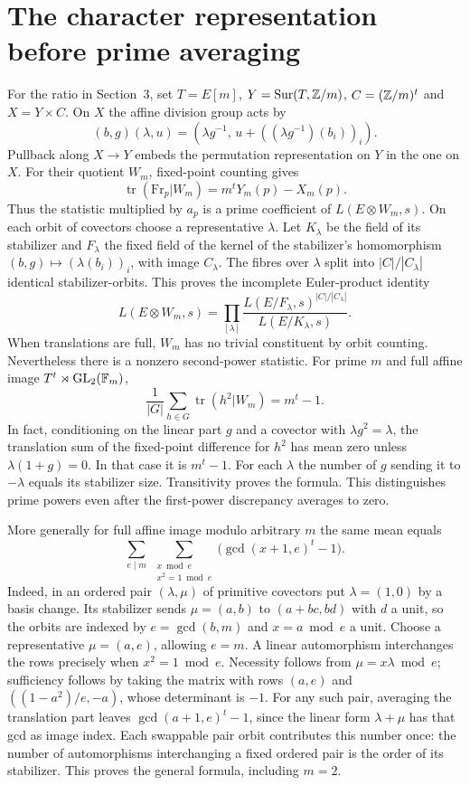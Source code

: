 \documentclass[11pt]{article}
\begin{document}
\section{The character representation before prime averaging}
For the ratio in Section~3, set $T=E[m]$, $Y=\operatorname{Sur}(T,\mathbb Z/m)$, $C=(\mathbb Z/m)^t$ and $X=Y\times C$. On $X$ the affine division group acts by
\[
 (b,g)(\lambda,u)=(\lambda g^{-1},\,u+((\lambda g^{-1})(b_i))_i).
\]
Pullback along $X\to Y$ embeds the permutation representation on $Y$ in the one on $X$. For their quotient $W_m$, fixed-point counting gives
\[
 \operatorname{tr}(\mathrm{Fr}_p|W_m)=m^tY_m(p)-X_m(p).
\]
Thus the statistic multiplied by $a_p$ is a prime coefficient of $L(E\otimes W_m,s)$. On each orbit of covectors choose a representative $\lambda$. Let $K_\lambda$ be the field of its stabilizer and $F_\lambda$ the fixed field of the kernel of the stabilizer's homomorphism $(b,g)\mapsto (\lambda(b_i))_i$, with image $C_\lambda$. The fibres over $\lambda$ split into $|C|/|C_\lambda|$ identical stabilizer-orbits. This proves the incomplete Euler-product identity
\[
 L(E\otimes W_m,s)=
 \prod_{[\lambda]}\frac{L(E/F_\lambda,s)^{|C|/|C_\lambda|}}{L(E/K_\lambda,s)} .
\]
When translations are full, $W_m$ has no trivial constituent by orbit counting. Nevertheless there is a nonzero second-power statistic. For prime $m$ and full affine image $T^t\rtimes\mathrm{GL}_2(\mathbb F_m)$,
\[
 \frac{1}{|G|}\sum_{h\in G}\operatorname{tr}(h^2|W_m)=m^t-1.
\]
In fact, conditioning on the linear part $g$ and a covector with $\lambda g^2=\lambda$, the translation sum of the fixed-point difference for $h^2$ has mean zero unless $\lambda(1+g)=0$. In that case it is $m^t-1$. For each $\lambda$ the number of $g$ sending it to $-\lambda$ equals its stabilizer size. Transitivity proves the formula. This distinguishes prime powers even after the first-power discrepancy averages to zero.

More generally for full affine image modulo arbitrary $m$ the same mean equals
\[
 \sum_{e\mid m}\ \sum_{\substack{x\bmod e\\ x^2=1\bmod e}}
 \bigl(\gcd(x+1,e)^t-1\bigr).
\]
Indeed, in an ordered pair $(\lambda,\mu)$ of primitive covectors put $\lambda=(1,0)$ by a basis change. Its stabilizer sends $\mu=(a,b)$ to $(a+bc,bd)$ with $d$ a unit, so the orbits are indexed by $e=\gcd(b,m)$ and $x=a\bmod e$ a unit. Choose a representative $\mu=(a,e)$, allowing $e=m$. A linear automorphism interchanges the rows precisely when $x^2=1\bmod e$. Necessity follows from $\mu=x\lambda\bmod e$; sufficiency follows by taking the matrix with rows $(a,e)$ and $((1-a^2)/e,-a)$, whose determinant is $-1$. For any such pair, averaging the translation part leaves $\gcd(a+1,e)^t-1$, since the linear form $\lambda+\mu$ has that gcd as image index. Each swappable pair orbit contributes this number once: the number of automorphisms interchanging a fixed ordered pair is the order of its stabilizer. This proves the general formula, including $m=2$.
\end{document}
